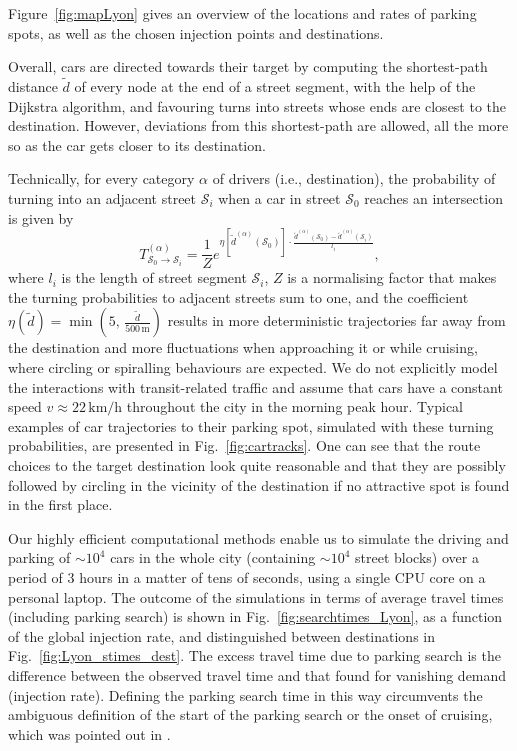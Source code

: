 \documentclass[trsc,reprint]{informs3}
\newcommand{\alp}{^{(\alpha)}}
\newcommand{\AN}[1]{#1}
\begin{document}
Figure~\ref{fig:mapLyon} gives an overview of the locations and rates of parking spots, as well as the chosen injection points and destinations.
\AN{
Overall,} cars are directed towards their target by computing the shortest-path distance $\tilde{d}$ of every node at the end of a street segment, with the help of the Dijkstra algorithm, and 
favouring turns into streets whose ends are closest to the destination.
\AN{However, deviations from this shortest-path are allowed, all the more so as the car gets closer to its destination.
} 
Technically, 
for every category $\alpha$ of drivers (i.e., destination), the probability of turning 
into an adjacent street $\mathcal{S}_i$ when a car in street $\mathcal{S}_0$ reaches an intersection is given by
\begin{equation}
    T\alp_{\mathcal{S}_0 \to \mathcal{S}_i} = \frac{1}{Z} e^{\eta[ \tilde{d}\alp(\mathcal{S}_0)]\cdot\frac{\tilde{d}\alp(\mathcal{S}_0)-\tilde{d}\alp(\mathcal{S}_i)}{l_i}}, 
\end{equation}
where $l_i$ is the length of street segment $\mathcal{S}_i$, $Z$ is a normalising factor
that makes the turning probabilities to adjacent streets sum to one, and the coefficient
$\eta(\tilde{d})=\min(5,\,\frac{\tilde{d}}{500\,\mathrm{m}})$ results in more deterministic trajectories 
far away from the destination and more fluctuations when approaching it or while cruising, where circling or spiralling behaviours are expected. We do not explicitly model the interactions with transit-related traffic and assume that cars have a constant speed $v\approx 22\,\mathrm{km/h}$ throughout the city in the morning peak hour.
Typical examples of car trajectories to their parking spot, simulated with these turning probabilities, are presented in Fig.~\ref{fig:cartracks}. One can see that the route choices to the target destination look quite reasonable and that they are  possibly followed by circling in the vicinity of the destination if no attractive spot is found in the first place.

Our highly efficient computational methods enable us to simulate the driving and parking of 
$\sim 10^4$ cars in the whole city (containing $\sim 10^4$ street blocks)  over a period of 3 hours in a matter of tens of seconds, using a single CPU core on a personal laptop. The outcome
of the simulations in terms of average travel times (including parking search) is shown in Fig.~\ref{fig:searchtimes_Lyon}, as a function of the global injection rate, and distinguished between destinations in Fig.~\ref{fig:Lyon_stimes_dest}.  The excess travel time due to parking search is the difference
between the observed travel time and that found for vanishing demand (injection rate). Defining the parking search time
in this way circumvents the ambiguous definition of the start of the parking search or the onset of cruising, which was pointed out in \citep{millard2020parking}.
\end{document}

